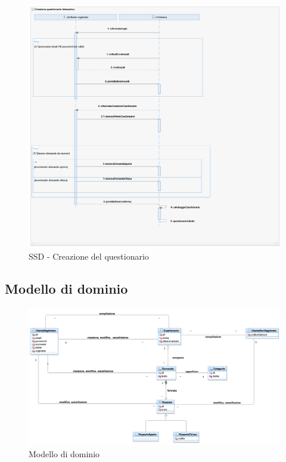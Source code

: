 \documentclass[12pt]{article}
\begin{document}
\begin{figure}[H]
\centering
\includegraphics[scale=0.47]{UNIMIBModule_CreazionequestionarioSequenceDiagram.png}
\caption{SSD - Creazione del questionario}
\end{figure}



\subsection{Modello di dominio}
\begin{figure}[H]
\centering
\includegraphics[scale=0.5]{UNIMIBModule_UniMiBModuleDomainLayer.png}
\caption{Modello di dominio}
\end{figure}
\end{document}

